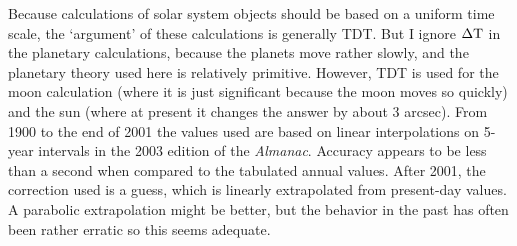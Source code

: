 Because calculations of 
solar system objects should be based on a uniform time scale, the
`argument' of these calculations is generally TDT.  But I ignore
$\rm \Delta T$ in the planetary calculations, because the
planets move rather slowly, and the planetary theory used here
is relatively primitive.  However, TDT is used for the moon calculation
(where it is just significant because the moon moves so quickly) 
and the sun (where at present it changes the answer by about 3 arcsec).
From 1900 to the end of
2001 the values used are based on linear interpolations on 5-year
intervals in the 2003 edition of the {\it Almanac}.  Accuracy appears to be
less than a second when compared to the tabulated annual values.
After 2001, the correction used is a guess, which 
is linearly extrapolated from present-day values.  A parabolic
extrapolation might be better, but the behavior in the past has
often been rather erratic so this seems adequate.

